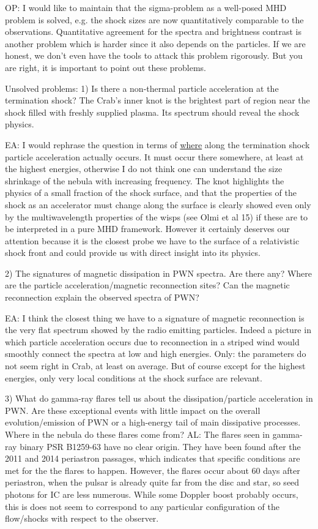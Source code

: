 OP: I would like to maintain that the sigma-problem as a well-posed MHD problem is solved, e.g. the shock sizes are now quantitatively comparable to the observations.  Quantitative agreement for the spectra and brightness contrast is another problem which is harder since it also depends on the particles.  If we are honest, we don't even have the tools to attack this problem rigorously.  But you are right, it is important to point out these problems.  


Unsolved problems:
1) Is there a non-thermal particle acceleration at the termination shock? The Crab's inner knot is the brightest part of region near the shock filled with freshly supplied plasma. Its spectrum should reveal the shock physics. 

EA: I would rephrase the question in terms of \underline{where} along the termination shock particle acceleration actually occurs. It must occur there somewhere, at least at the highest energies, otherwise I do not think one can understand the size shrinkage of the nebula with increasing frequency. 
The knot highlights the physics of a small fraction of the shock surface, and that the properties of the shock as an accelerator must change along the surface is clearly showed even only by the multiwavelength properties of the wisps (see Olmi et al 15) if these are to be interpreted in a pure MHD framework. However it certainly deserves our attention because it is the closest probe we have to the surface of a relativistic shock front and could provide us with direct insight into its physics. 


2) The signatures of magnetic dissipation in PWN spectra. Are there any?  Where are the particle acceleration/magnetic reconnection sites? Can the magnetic reconnection explain the observed spectra of PWN? 

EA: I think the closest thing we have to a signature of magnetic reconnection is the very flat spectrum showed by the radio emitting particles. Indeed a picture in which particle acceleration occurs due to reconnection in a striped wind would smoothly connect the spectra at low and high energies. Only: the parameters do not seem right in Crab, at least on average. But of course except for the highest energies, only very local conditions at the shock surface are relevant.

3) What do gamma-ray flares tell us about the dissipation/particle acceleration in PWN. 
Are these exceptional events with little impact on the overall evolution/emission of PWN or a high-energy tail of main dissipative processes. Where in the nebula do these flares come from? 
AL: The flares seen in gamma-ray binary PSR B1259-63 have no clear origin.  They have been found after the  2011 and 2014 periastron passages, which indicates that specific conditions are met for the the flares to happen. However, the flares occur about 60 days after periastron, when the pulsar is already quite far from the disc and star, so seed photons for IC are less numerous. While some Doppler boost probably occurs, this is does not seem to correspond to any particular configuration of the flow/shocks with respect to the observer.


